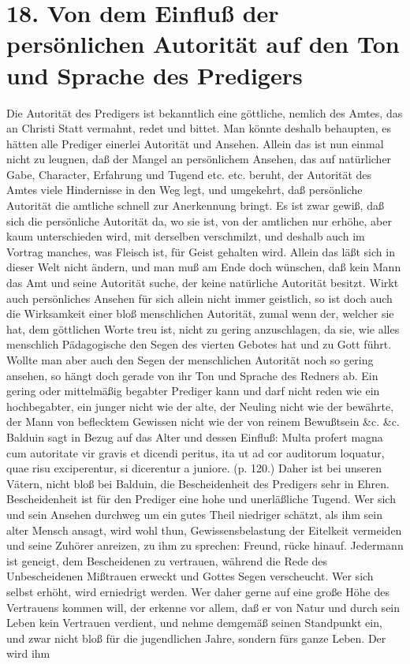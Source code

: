 \section[18. Von dem Einfluß der persönlichen Autorität]{18. Von dem Einfluß der persönlichen Autorität auf den Ton und Sprache des Predigers}

Die Autorität des Predigers ist bekanntlich eine göttliche, nemlich des Amtes, das an Christi Statt vermahnt, redet und bittet. Man könnte deshalb behaupten, es hätten alle Prediger einerlei Autorität und Ansehen. Allein das ist nun einmal nicht zu leugnen, daß der Mangel an persönlichem Ansehen, das auf natürlicher Gabe, Character, Erfahrung und Tugend etc. etc. beruht, der Autorität des Amtes viele Hindernisse in den Weg legt, und umgekehrt, daß persönliche Autorität die amtliche schnell zur Anerkennung bringt. Es ist zwar gewiß, daß sich die persönliche Autorität da, wo sie ist, von der amtlichen nur erhöhe, aber kaum unterschieden wird, mit derselben verschmilzt, und deshalb auch im Vortrag manches, was Fleisch ist, für Geist gehalten wird. Allein das läßt sich in dieser Welt nicht ändern, und man muß am Ende doch wünschen, daß kein Mann das Amt und seine Autorität suche, der keine natürliche Autorität besitzt. Wirkt auch persönliches Ansehen für sich allein nicht immer geistlich, so ist doch auch die Wirksamkeit einer bloß menschlichen Autorität, zumal wenn der, welcher sie hat, dem göttlichen Worte treu ist, nicht zu
gering anzuschlagen, da sie, wie alles menschlich Pädagogische den Segen des vierten Gebotes hat und zu Gott führt. Wollte man aber auch den Segen der menschlichen Autorität noch so gering ansehen, so hängt doch gerade von ihr Ton und Sprache des Redners ab. Ein gering oder mittelmäßig begabter Prediger kann und darf nicht reden wie ein hochbegabter, ein junger nicht wie der alte, der Neuling nicht wie der bewährte, der Mann von beflecktem Gewissen nicht wie der von reinem Bewußtsein \&c. \&c. Balduin sagt in Bezug auf das Alter und dessen Einfluß: Multa profert magna cum autoritate vir gravis et dicendi peritus, ita ut ad cor auditorum loquatur, quae risu exciperentur, si dicerentur a juniore. (p. 120.) Daher ist bei unseren Vätern, nicht bloß bei Balduin, die Bescheidenheit des Predigers sehr in Ehren. Bescheidenheit ist für den Prediger eine hohe und unerläßliche Tugend. Wer sich und sein Ansehen durchweg um ein gutes Theil niedriger schätzt, als ihm sein alter Mensch ansagt, wird wohl thun, Gewissensbelastung der Eitelkeit vermeiden und seine Zuhörer anreizen, zu ihm zu sprechen: Freund, rücke hinauf. Jedermann ist geneigt, dem Bescheidenen zu vertrauen, während die Rede des Unbescheidenen Mißtrauen erweckt und Gottes Segen verscheucht. Wer sich selbst erhöht, wird erniedrigt werden. Wer daher gerne auf eine große Höhe des Vertrauens kommen will, der erkenne vor allem, daß er von Natur und durch sein Leben kein Vertrauen verdient, und nehme demgemäß seinen Standpunkt ein, und zwar nicht bloß für die jugendlichen Jahre, sondern fürs ganze Leben. Der wird ihm
